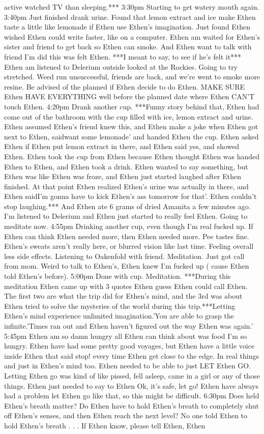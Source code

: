 \documentclass[12pt]{book}
\begin{document}
active watched TV than sleeping.*** 3:30pm Starting to get watery mouth again. 3:40pm Just finished drank urine. Found that lemon extract and ice make Ethen taste a little like lemonade if Ethen use Ethen's imagination. Just found Ethen wished Ethen could write faster, like on a computer. Ethen am waited for Ethen's sister and friend to get back so Ethen can smoke. And Ethen want to talk with friend I'm did this was felt Ethen. ***I meant to say, to see if he's felt it*** Ethen am listened to Delerium outside looked at the Rockies. Going to try stretched. Weed run unsuccessful, friends are back, and we're went to smoke more resine. Be advised of the planned if Ethen decide to do Ethen. MAKE SURE Ethen HAVE EVERYTHING well before the planned date where Ethen CAN'T touch Ethen. 4:20pm Drank another cup. ***Funny story behind that, Ethen had come out of the bathroom with the cup filled with ice, lemon extract and urine. Ethen assumed Ethen's friend knew this, and Ethen make a joke when Ethen got next to Ethen, saidwant some lemonade' and handed Ethen the cup. Ethen asked Ethen if Ethen put lemon extract in there, and Ethen said yes, and showed Ethen. Ethen took the cup from Ethen because Ethen thought Ethen was handed Ethen to Ethen, and Ethen took a drink. Ethen wanted to say something, but Ethen was like Ethen was froze, and Ethen just started laughed after Ethen finished. At that point Ethen realized Ethen's urine was actually in there, and Ethen saidI'm gonna have to kick Ethen's ass tomorrow for that'. Ethen couldn't stop laughing.*** And Ethen ate 6 grams of dried Amanita a few minutes ago. I'm listened to Delerium and Ethen just started to really feel Ethen. Going to meditate now. 4:55pm Drinking another cup, even though I'm real fucked up. If Ethen can think Ethen needed more, then Ethen needed more. Pee tastes fine. Ethen's sweats aren't really here, or blurred vision like last time. Feeling overall less side effects. Listening to Oakenfold with friend. Meditation. Just got call from mom. Weird to talk to Ethen's, Ethen knew I'm fucked up ( cause Ethen told Ethen's before). 5:00pm Done with cup. Meditation. ***During this meditation Ethen came up with 3 quotes Ethen guess Ethen could call Ethen. The first two are what the trip did for Ethen's mind, and the 3rd was about Ethen tried to solve the mysteries of the world during this trip.***Letting Ethen's mind experience unlimited imagination.'You are able to grasp the infinite.'Times ran out and Ethen haven't figured out the way Ethen was again.' 5:45pm Ethen am so damn hungry all Ethen can think about was food I'm so hungry. Ethen have had some pretty good voyages, but Ethen have a little voice inside Ethen that said stop! every time Ethen get close to the edge. In real things and just in Ethen's mind too. Ethen needed to be able to just LET Ethen GO. Letting Ethen go was kind of like pissed, fell asleep, came in a girl or any of those things. Ethen just needed to say to Ethen Ok, it's safe, let go! Ethen have always had a problem let Ethen go like that, so this might be difficult. 6:30pm Does held Ethen's breath matter? Do Ethen have to hold Ethen's breath to completely shut off Ethen's senses, and then Ethen reach the next level? No one told Ethen to hold Ethen's breath . . .  If Ethen know, please tell Ethen, Ethen 
\end{document}
